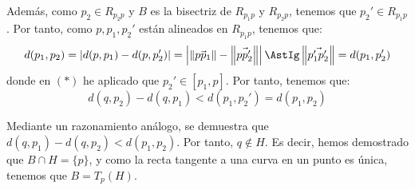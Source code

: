 \begin{ejercicio}
\begin{enumerate}
    Además, como $p_2\in R_{p_2p}$ y $B$ es la bisectriz de $R_{p_1p}$ y $R_{p_2p}$,
    tenemos que $p_2'\in R_{p_1p}$. Por tanto, como $p, p_1, p_2'$ están alineados en $R_{p_1p}$, tenemos que:
    \begin{equation*}
        d(p_1, p_2) = |d(p, p_1) - d(p, p_2')| = \left|
            \left\|\vec{pp_1}\right\| - \left\|\vec{pp_2'}\right\|
        \right|         
        \AstIg 
            \left\|\vec{p_1'p_2'}\right\|
        = d(p_1, p_2')
    \end{equation*}
    donde en $(\ast)$ he aplicado que $p_2'\in [p_1, p]$. Por tanto, tenemos que:
    \begin{equation*}
        d(q, p_2)  - d(q, p_1)
        < d(p_1, p_2') = d(p_1, p_2)
    \end{equation*}

    Mediante un razonamiento análogo, se demuestra que $d(q, p_1)  - d(q, p_2) < d(p_1, p_2)$. Por tanto, $q\notin H$.
    Es decir, hemos demostrado que $B\cap H = \{p\}$, y como la recta tangente a una curva en un punto es única,
    tenemos que $B=T_p(H)$.
\end{enumerate}
\end{ejercicio}


